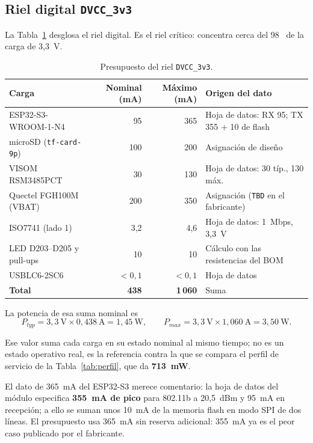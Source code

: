 \documentclass[11pt,a4paper]{article}
\newcommand{\pct}{\text{\char37}}
\begin{document}
\subsection{Riel digital \texttt{DVCC\_3v3}}

La Tabla~\ref{tab:dvcc} desglosa el riel digital. Es el riel crítico: concentra
cerca del 98~\pct{} de la carga de 3,3~V.

\begin{table}[H]
\centering
\caption{Presupuesto del riel \texttt{DVCC\_3v3}.}
\label{tab:dvcc}
\small
\begin{tabularx}{\textwidth}{@{}X r r l@{}}
\toprule
\textbf{Carga} & \textbf{Nominal (mA)} & \textbf{Máximo (mA)} & \textbf{Origen del dato} \\
\midrule
ESP32-S3-WROOM-1-N4 & 95 & 365 & Hoja de datos: RX 95; TX 355 + 10 de flash \\
microSD (\texttt{tf-card-9p}) & 100 & 200 & Asignación de diseño \\
VISOM RSM3485PCT & 30 & 130 & Hoja de datos: 30 típ., 130 máx. \\
Quectel FGH100M (VBAT) & 200 & 350 & Asignación (\texttt{TBD} en el fabricante) \\
ISO7741 (lado 1) & 3,2 & 4,6 & Hoja de datos: 1~Mbps, 3,3~V \\
LED D203--D205 y pull-ups & 10 & 10 & Cálculo con las resistencias del BOM \\
USBLC6-2SC6 & $<0,1$ & $<0,1$ & Hoja de datos \\
\midrule
\textbf{Total} & \textbf{438} & \textbf{1\,060} & Suma \\
\bottomrule
\end{tabularx}
\end{table}

\noindent La potencia de esa suma nominal es
\begin{equation}
P_{typ} = 3{,}3~\mathrm{V}\times 0{,}438~\mathrm{A} = 1{,}45~\mathrm{W},
\qquad
P_{max} = 3{,}3~\mathrm{V}\times 1{,}060~\mathrm{A} = 3{,}50~\mathrm{W}.
\end{equation}

\noindent Ese valor suma cada carga en su estado nominal al mismo tiempo; no es
un estado operativo real, es la referencia contra la que se compara el perfil de
servicio de la Tabla~\ref{tab:perfil}, que da \textbf{713~mW}.

\noindent El dato de 365~mA del ESP32-S3 merece comentario: la hoja de datos del
módulo especifica \textbf{355~mA de pico} para 802.11b a 20,5~dBm y 95~mA en
recepción; a ello se suman unos 10~mA de la memoria flash en modo SPI de dos
líneas. El presupuesto usa 365~mA sin reserva adicional: 355~mA ya es el peor
caso publicado por el fabricante.
\end{document}
